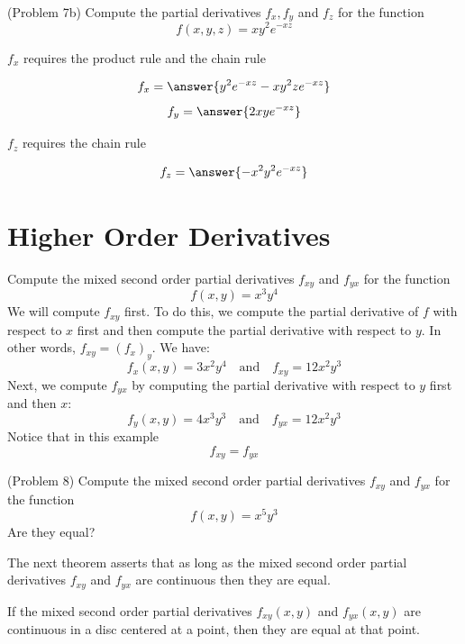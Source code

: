 \documentclass[handout]{ximera}
\begin{document}
\begin{problem}(Problem 7b)
Compute the partial derivatives $f_x, f_y$ and $f_z$ for the function
\[
f(x,y,z) = xy^2 e^{-xz}
\]
\begin{hint}
$f_x$ requires the product rule and the chain rule
\end{hint}

\[
f_x = \answer{y^2e^{-xz} - xy^2ze^{-xz}}
\]
\[
f_y = \answer{2xye^{-xz}}
\]
\begin{hint}
$f_z$ requires the chain rule
\end{hint}

\[
f_z = \answer{-x^2y^2 e^{-xz}}
\]
\end{problem}

\begin{center}
\end{center}


\section{Higher Order Derivatives}

\begin{example}[Example 8]
Compute the mixed second order partial derivatives $f_{xy}$ and $f_{yx}$ for the function 
\[
f(x,y) = x^3y^4
\]
We will compute $f_{xy}$ first.  To do this, we compute the partial 
derivative of $f$ with respect to $x$ first and then compute the partial 
derivative with respect to $y$.  In other words, $f_{xy} = (f_x)_y$.  We have:
\[
f_x(x,y) = 3x^2y^4 \quad \text{and} \quad f_{xy} = 12x^2y^3
\]
Next, we compute $f_{yx}$ by computing the partial derivative with 
respect to $y$ first and then $x$:
\[
f_y(x,y) = 4x^3y^3 \quad \text{and} \quad f_{yx} = 12x^2y^3
\]
Notice that in this example
\[
f_{xy} = f_{yx}
\]
\end{example}

\begin{problem}(Problem 8)
Compute the mixed second order partial derivatives $f_{xy}$ and $f_{yx}$ for the function 
\[
f(x,y) = x^5 y^3
\]
Are they equal?
\end{problem}

The next theorem asserts that as long as the mixed second order 
partial derivatives $f_{xy}$ and $f_{yx}$  are continuous then they are equal.
\begin{theorem}
If the mixed second order partial derivatives $f_{xy}(x,y)$ and $f_{yx}(x,y)$ are 
continuous in a disc centered at a point, 
then they are equal at that point.
\end{theorem}
\end{document}
